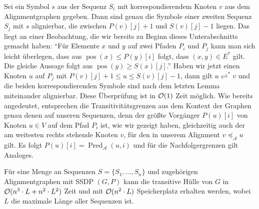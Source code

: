 Sei ein Symbol $s$ aus der Sequenz $S_i$ mit korrespondierendem Knoten $v$ aus dem Alignmentgraphen gegeben. Dann sind genau die Symbole einer zweiten Sequenz $S_j$ mit $s$ alignierbar, die zwischen $P(v)[j] + 1$ und $S(v)[j] - 1$ liegen. Das liegt an einer Beobachtung, die wir bereits zu Beginn dieses Unterabschnitts gemacht haben: \enquote{Für Elemente $x$ und $y$ auf zwei Pfaden $P_i$ und $P_j$ kann man sich leicht überlegen, dass aus $\operatorname{pos}(x) \leq P(y)[i]$ folgt, dass $(x,y)\in E^*$ gilt. Die gleiche Aussage folgt aus $\operatorname{pos}(y) \geq S(x)[j]$.} Haben wir jetzt einen Knoten $u$ auf $P_j$ mit $P(v)[j] +1 \leq u \leq S(v)[j] - 1$, dann gilt $u \rightleftharpoons^{*} v$ und die beiden korrespondierenden Symbole sind nach dem letzten Lemma miteinander alignierbar. Diese Überprüfung ist in $\mathcal{O}(1)$ Zeit möglich. Wie bereits angedeutet, entsprechen die Transitivitätsgrenzen aus dem Kontext der Graphen genau denen auf unseren Sequenzen, denn der größte Vorgänger $P(u)[i]$ von Knoten $u\in V$ auf dem Pfad $P_i$  ist, wie wir gezeigt haben, gleichzeitig auch der am weitesten rechts stehende Knoten $v$, für den in unserem Alignment $v \preceq_{\mathcal{A}} u$ gilt. Es folgt $P(u)[i] = \operatorname{Pred}_{\mathcal{A}}(u,i)$ und für die Nachfolgergrenzen gilt Analoges.

\begin{korollar}\label{korollar:trans_hull}
	Für eine Menge an Sequenzen $S = \{S_1, \dots, S_n\}$ und zugehörigen Alignmentgraphen mit SSDP $(G,P)$ kann die transitive Hülle von $G$ in $\mathcal{O}(n^3\cdot L + n^2\cdot L^2)$ Zeit und mit $\mathcal{O}(n^2\cdot L)$ Speicherplatz erhalten werden, wobei $L$ die maximale Länge aller Sequenzen ist.
\end{korollar}

